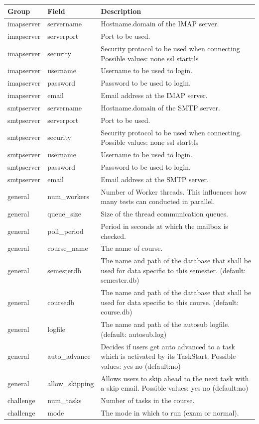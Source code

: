 \begin{tabular}{|p{2.5cm}|p{2.5cm}|p{8cm}|}
\hline
{\bf Group} & {\bf Field} & {\bf Description} \\
\hline
\hline
imapserver & servername & Hostname.domain of the IMAP server.\\
\hline
imapserver & serverport & Port to be used.\\
\hline
imapserver & security & Security protocol to be used when connecting 
    Possible values: none ssl starttls \\
\hline
imapserver & username & Username to be used to login. \\ 
\hline
imapserver & password & Password to be used to login. \\
\hline
imapserver & email & Email address at the IMAP server. \\
\hline
\hline
smtpserver & servername & Hostname.domain of the SMTP server.\\
\hline
smtpserver & serverport & Port to be used. \\
\hline
smtpserver & security & Security protocol to be used when connecting.
    Possible values: none ssl starttls \\
\hline
smtpserver & username & Username to be used to login. \\
\hline
smtpserver & password & Password to be used to login. \\
\hline
smtpserver & email & Email address at the SMTP server. \\
\hline
\hline
general & num\_workers & Number of Worker threads. This influences how many
	tests can conducted in parallel. \\
\hline
general & queue\_size & Size of the thread communication queues. \\
\hline
general & poll\_period & Period in seconds at which the mailbox is checked.\\
\hline
general & course\_name & The name of course.\\
\hline
general & semesterdb & The name and path of the database that shall be used for data specific to
    this semester. (default: semester.db) \\
\hline
general & coursedb & The name and path of the database that shall be used for data specific to
    this course. (default: course.db)\\
\hline
general & logfile & The name and path of the autosub logfile. (default: autosub.log)\\
\hline
general & auto\_advance & Decides if users get auto advanced to a task which is
    activated by its TaskStart. Possible values: yes no (default:no) \\
\hline
general & allow\_skipping & Allows users to skip ahead to the next task with a 
							 skip email. Possible values: yes no (default:no) \\
\hline
\hline
challenge & num\_tasks & Number of tasks in the course. \\
\hline
challenge & mode & The mode in which to run (exam or normal). \\ 
\hline
\end{tabular}

